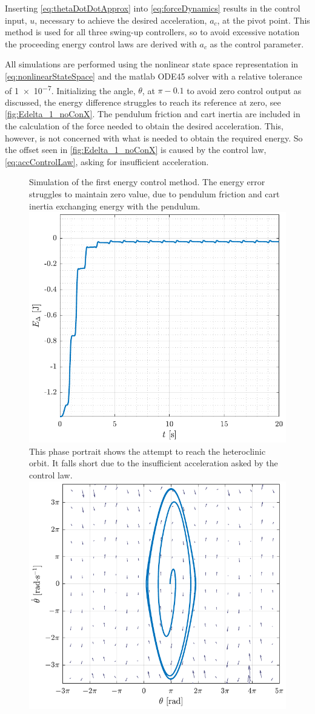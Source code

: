 %
Inserting \autoref{eq:thetaDotDotApprox} into \autoref{eq:forceDynamics} results in the control input, $u$, necessary to achieve the desired acceleration, $a_c$, at the pivot point. This method is used for all three swing-up controllers, so to avoid excessive notation the proceeding energy control laws are derived with $a_c$ as the control parameter.

All simulations are performed using the nonlinear state space representation in \autoref{eq:nonlinearStateSpace} and the matlab ODE45 solver with a relative tolerance of \SI{1e-7}{}. Initializing the angle, $\theta$, at $\pi-0.1$ to avoid zero control output as discussed, the energy difference struggles to reach its reference at zero, see \autoref{fig:Edelta_1_noConX}. The pendulum friction and cart inertia are included in the calculation of the force needed to obtain the desired acceleration. This, however, is not concerned with what is needed to obtain the required energy. So the offset seen in \autoref{fig:Edelta_1_noConX} is caused by the control law, \autoref{eq:accControlLaw}, asking for insufficient acceleration.
%
\begin{figure}[H]
  \hspace{-10pt}
  \captionbox
  {
    Simulation of the first energy control method. The energy error struggles to maintain zero value, due to pendulum friction and cart inertia exchanging energy with the pendulum.
    \label{fig:Edelta_1_noConX}
  }
  {
    \hspace{-1cm}
    \includegraphics[width=.455\textwidth]{figures/Edelta_1_noConX}
  }
  \hspace{20pt}
  \captionbox 
  {
    This phase portrait shows the attempt to reach the heteroclinic orbit. It falls short due to the insufficient acceleration asked by the control law.
    \label{fig:phase_1_noConX}
  }
  {
    \hspace{-1cm}
    \includegraphics[width=.46\textwidth]{figures/phase_1_noConX}
  }  
\end{figure}
